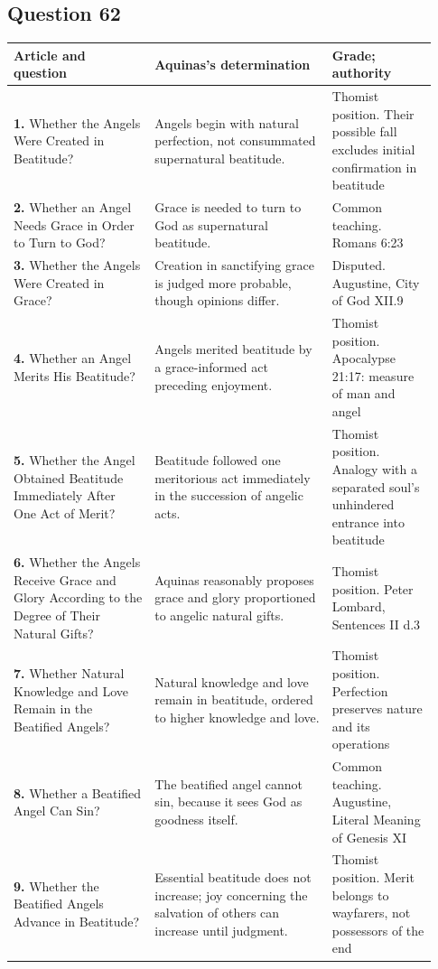\subsection{Question 62}
\begin{longtable}{@{}>{\raggedright\arraybackslash}p{0.31\linewidth}>{\raggedright\arraybackslash}p{0.39\linewidth}>{\raggedright\arraybackslash}p{0.23\linewidth}@{}}
\toprule
Article and question & Aquinas's determination & Grade; authority\\
\midrule\endhead
\textbf{1.} Whether the Angels Were Created in Beatitude? & Angels begin with natural perfection, not consummated supernatural beatitude. & Thomist position. Their possible fall excludes initial confirmation in beatitude\\
\textbf{2.} Whether an Angel Needs Grace in Order to Turn to God? & Grace is needed to turn to God as supernatural beatitude. & Common teaching. Romans 6:23\\
\textbf{3.} Whether the Angels Were Created in Grace? & Creation in sanctifying grace is judged more probable, though opinions differ. & Disputed. Augustine, City of God XII.9\\
\textbf{4.} Whether an Angel Merits His Beatitude? & Angels merited beatitude by a grace-informed act preceding enjoyment. & Thomist position. Apocalypse 21:17: measure of man and angel\\
\textbf{5.} Whether the Angel Obtained Beatitude Immediately After One Act of Merit? & Beatitude followed one meritorious act immediately in the succession of angelic acts. & Thomist position. Analogy with a separated soul's unhindered entrance into beatitude\\
\textbf{6.} Whether the Angels Receive Grace and Glory According to the Degree of Their Natural Gifts? & Aquinas reasonably proposes grace and glory proportioned to angelic natural gifts. & Thomist position. Peter Lombard, Sentences II d.3\\
\textbf{7.} Whether Natural Knowledge and Love Remain in the Beatified Angels? & Natural knowledge and love remain in beatitude, ordered to higher knowledge and love. & Thomist position. Perfection preserves nature and its operations\\
\textbf{8.} Whether a Beatified Angel Can Sin? & The beatified angel cannot sin, because it sees God as goodness itself. & Common teaching. Augustine, Literal Meaning of Genesis XI\\
\textbf{9.} Whether the Beatified Angels Advance in Beatitude? & Essential beatitude does not increase; joy concerning the salvation of others can increase until judgment. & Thomist position. Merit belongs to wayfarers, not possessors of the end\\
\bottomrule
\end{longtable}
